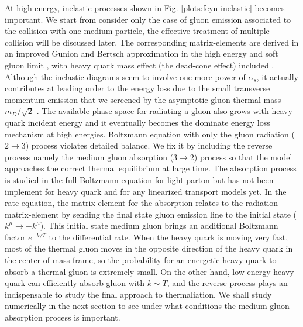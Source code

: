 \documentclass[aps, prc, reprint, amsmath, groupedaddress, nofootinbib]{revtex4-1}
\begin{document}
At high energy, inelastic processes shown in Fig. \ref{plots:feyn-inelastic} becomes important.
We start from consider only the case of gluon emission associated to the collision with one medium particle, the effective treatment of multiple collision will be discussed later.
The corresponding matrix-elements are derived in an improved Gunion and Bertsch approximation in the high energy and soft gluon limit \cite{PhysRevD.25.746, Fochler:2013epa}, with heavy quark mass effect (the dead-cone effect) included \cite{Uphoff:2014hza}.
Although the inelastic diagrams seem to involve one more power of $\alpha_s$, it actually contributes at leading order to the energy loss due to the small transverse momentum emission that we screened by the asymptotic gluon thermal mass $m_D/\sqrt{2}$ \cite{Ghiglieri:2015ala}.
The available phase space for radiating a gluon also grows with heavy quark incident energy and it eventually becomes the dominate energy loss mechanism at high energies.
Boltzmann equation with only the gluon radiation ($2\rightarrow 3$) process violates detailed balance.
We fix it by including the reverse process namely the medium gluon absorption ($3\rightarrow 2$) process so that the model approaches the correct thermal equilibrium at large time.
The absorption process is studied in the full Boltzmann equation \cite{Xu:2004mz} for light parton but has not been implement for heavy quark and for any linearized transport models yet.
In the rate equation, the matrix-element for the absorption relates to the radiation matrix-element by sending the final state gluon emission line to the initial state ($k^\mu \rightarrow -k^\mu$).
This initial state medium gluon brings an additional Boltzmann factor $e^{-k/T}$ to the differential rate.
When the heavy quark is moving very fast, most of the thermal gluon moves in the opposite direction of the heavy quark in the center of mass frame,
so the probability for an energetic heavy quark to absorb a thermal gluon is extremely small. 
On the other hand, low energy heavy quark can efficiently absorb gluon with $k \sim T$, and the reverse process plays an indispensable to study the final approach to thermaliation. 
We shall study numerically in the next section to see under what conditions the medium gluon absorption process is important.
\end{document}
